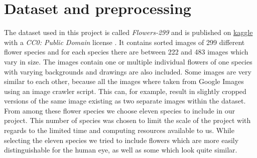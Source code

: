 \section{Dataset and preprocessing}
\label{sec:dataset}
The dataset used in this project is called \textit{Flowers-299} and is published on \href{https://www.kaggle.com/bogdancretu/flower299}{kaggle} with a \textit{CC0: Public Domain} license \cite{data}.
It contains sorted images of 299 different flower species and for each species there are between 222 and 483 images which vary in size.
The images contain one or multiple individual flowers of one species with varying backgrounds and drawings are also included.
Some images are very similar to each other, because all the images where taken from Google Images using an image crawler script. 
This can, for example, result in slightly cropped versions of the same image existing as two separate images within the dataset.
From among these flower species we choose eleven species to include in our project.
This number of species was chosen to limit the scale of the project with regards to the limited time and computing resources available to us.
While selecting the eleven species we tried to include flowers which are more easily distinguishable for the human eye, as well as some which look quite similar.

